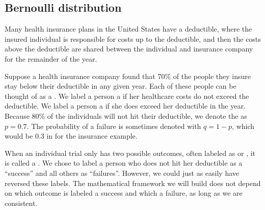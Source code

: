 \subsection{Bernoulli distribution}
\label{bernoulli}

\newcommand{\insureSprob}{0.7}
\newcommand{\insureSperc}{70\%}
\newcommand{\insureFprob}{0.3}
\newcommand{\insureFperc}{30\%}
\newcommand{\insureDistA}{0.7}
\newcommand{\insureDistB}{0.21}
\newcommand{\insureDistC}{0.063}
\newcommand{\insureDistD}{0.019}
\newcommand{\insureDistE}{0.006}
\newcommand{\insureCDistA}{0.7}
\newcommand{\insureCDistB}{0.91}
\newcommand{\insureCDistC}{0.973}
\newcommand{\insureCDistCComplement}{0.027}
\newcommand{\insureCDistD}{0.992}
\newcommand{\insureCDistE}{0.998}
\newcommand{\insureGeomMean}{1.43}


Many health insurance plans in the United States have
a deductible, where the insured individual is responsible
for costs up to the deductible, and then the costs above
the deductible are shared between the individual and
insurance company for the remainder of the year.

Suppose a health insurance company found that \insureSperc{} of the
people they insure stay below their deductible in any given year.
Each of these people can be thought of as a .
We label a person a  if her healthcare costs
do not exceed the deductible.
We label a person a  if she does exceed her
deductible in the year.
Because 80\% of the individuals will not hit their deductible,
we denote the  as
$p = \insureSprob{}$.
The probability of a failure is sometimes denoted with
$q = 1 - p$, which would be \insureFprob{} in for the insurance
example.

When an individual trial only has two possible outcomes, often
labeled as  or , it is called a
.
We chose to label a person who does not hit her deductible
as a ``success'' and all others as ``failures''.
However, we could just as easily have reversed these labels.
The mathematical framework we will build does not depend
on which outcome is labeled a success and which a failure,
as long as we are consistent.

